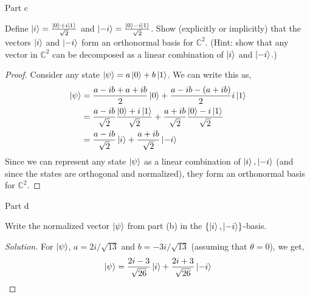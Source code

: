 \begin{solution}{Part c}\label{ques:3c}
  \begin{question}
    Define $\ket{i} = \frac{\ket{0} + i \ket{1}}{\sqrt{2}}$ and $\ket{-i} = \frac{\ket{0} - i\ket{1}}{\sqrt{2}}$. Show (explicitly or implicitly) that the vectors $\ket{i}$ and $\ket{-i}$ form an orthonormal basis for $\mathbb{C}^2$.
(Hint: show that any vector in $\mathbb{C}^2$ can be decomposed as a linear combination of $\ket{i}$ and $\ket{-i}$.)
  \end{question}
  \tcblower{}
  \begin{proof}
    Consider any state $\ket{\psi} = a\ket{0} + b\ket{1}$. We can write this as,
    \begin{equation}
      \begin{split}
        \ket{\psi} &= \frac{a - ib + a + ib}{2}\ket{0} + \frac{a - ib - (a + ib)}{2}i\ket{1}\\
                   &= \frac{a - ib}{\sqrt{2}}\frac{\ket{0} + i\ket{1}}{\sqrt{2}} + \frac{a + ib}{\sqrt{2}}\frac{\ket{0} - i\ket{1}}{\sqrt{2}}\\
                   &= \frac{a - ib}{\sqrt{2}}\ket{i} + \frac{a + ib}{\sqrt{2}}\ket{-i}
      \end{split}
    \end{equation}
    Since we can represent any state $\ket{\psi}$ as a linear combination of $\ket{i}, \ket{-i}$ (and since the states are orthogonal and normalized), they form an orthonormal basis for $\mathbb{C}^2$.
  \end{proof}
\end{solution}

\begin{solution}{Part d}\label{ques:3d}
  \begin{question}
    Write the normalized vector $\ket{\psi}$ from part (b) in the $\{\ket{i}, \ket{-i}\}$-basis.
  \end{question}
  \tcblower{}
  \begin{proof}[Solution]
    For $\ket{\psi}$, $a = 2i/\sqrt{13}$ and $b = -3i/\sqrt{13}$ (assuming that $\theta = 0$), we get,
    \begin{equation}
      \ket{\psi} = \frac{2i - 3}{\sqrt{26}}\ket{i} + \frac{2i + 3}{\sqrt{26}}\ket{-i}
    \end{equation}
  \end{proof}
\end{solution}

